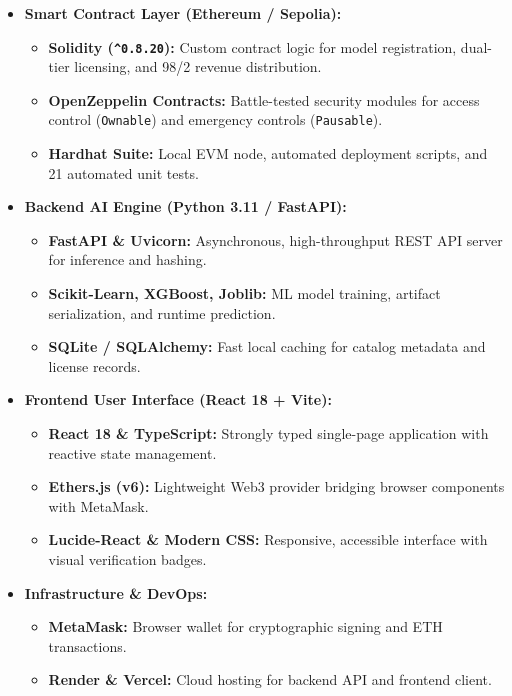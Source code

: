 \documentclass[11pt,a4paper]{article}
\begin{document}
\begin{itemize}[leftmargin=1.5em]
    \item \textbf{Smart Contract Layer (Ethereum / Sepolia):}
    \begin{itemize}[leftmargin=1.2em]
        \item \textbf{Solidity (\texttt{\^{}0.8.20}):} Custom contract logic for model registration, dual-tier licensing, and 98/2 revenue distribution.
        \item \textbf{OpenZeppelin Contracts:} Battle-tested security modules for access control (\texttt{Ownable}) and emergency controls (\texttt{Pausable}).
        \item \textbf{Hardhat Suite:} Local EVM node, automated deployment scripts, and 21 automated unit tests.
    \end{itemize}

    \item \textbf{Backend AI Engine (Python 3.11 / FastAPI):}
    \begin{itemize}[leftmargin=1.2em]
        \item \textbf{FastAPI \& Uvicorn:} Asynchronous, high-throughput REST API server for inference and hashing.
        \item \textbf{Scikit-Learn, XGBoost, Joblib:} ML model training, artifact serialization, and runtime prediction.
        \item \textbf{SQLite / SQLAlchemy:} Fast local caching for catalog metadata and license records.
    \end{itemize}

    \item \textbf{Frontend User Interface (React 18 + Vite):}
    \begin{itemize}[leftmargin=1.2em]
        \item \textbf{React 18 \& TypeScript:} Strongly typed single-page application with reactive state management.
        \item \textbf{Ethers.js (v6):} Lightweight Web3 provider bridging browser components with MetaMask.
        \item \textbf{Lucide-React \& Modern CSS:} Responsive, accessible interface with visual verification badges.
    \end{itemize}

    \item \textbf{Infrastructure \& DevOps:}
    \begin{itemize}[leftmargin=1.2em]
        \item \textbf{MetaMask:} Browser wallet for cryptographic signing and ETH transactions.
        \item \textbf{Render \& Vercel:} Cloud hosting for backend API and frontend client.
    \end{itemize}
\end{itemize}
\end{document}
